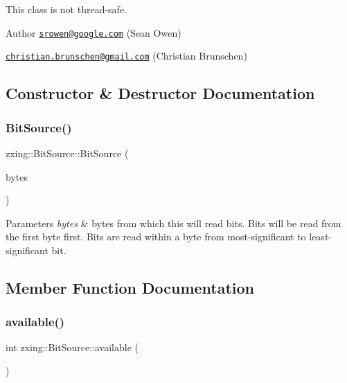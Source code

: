 This class is not thread-\/safe.

\begin{DoxyAuthor}{Author}
\href{mailto:srowen@google.com}{\tt srowen@google.\+com} (Sean Owen) 

\href{mailto:christian.brunschen@gmail.com}{\tt christian.\+brunschen@gmail.\+com} (Christian Brunschen) 
\end{DoxyAuthor}


\subsection{Constructor \& Destructor Documentation}
\mbox{\label{classzxing_1_1_bit_source_a65d6281c4c8eb6a069e49cbb4d8ab775}} 
\subsubsection{\texorpdfstring{Bit\+Source()}{BitSource()}}
{\footnotesize\ttfamily zxing\+::\+Bit\+Source\+::\+Bit\+Source (\begin{DoxyParamCaption}\item[{\mbox{\hyperlink{classzxing_1_1_array_ref}{Array\+Ref}}$<$ byte $>$ \&}]{bytes }\end{DoxyParamCaption})\hspace{0.3cm}{\ttfamily [inline]}}


\begin{DoxyParams}{Parameters}
{\em bytes} & bytes from which this will read bits. Bits will be read from the first byte first. Bits are read within a byte from most-\/significant to least-\/significant bit. \\
\hline
\end{DoxyParams}


\subsection{Member Function Documentation}
\mbox{\label{classzxing_1_1_bit_source_a9fd3c660b77ad591ceb0da69dd43566d}} 
\subsubsection{\texorpdfstring{available()}{available()}}
{\footnotesize\ttfamily int zxing\+::\+Bit\+Source\+::available (\begin{DoxyParamCaption}{ }\end{DoxyParamCaption})}

